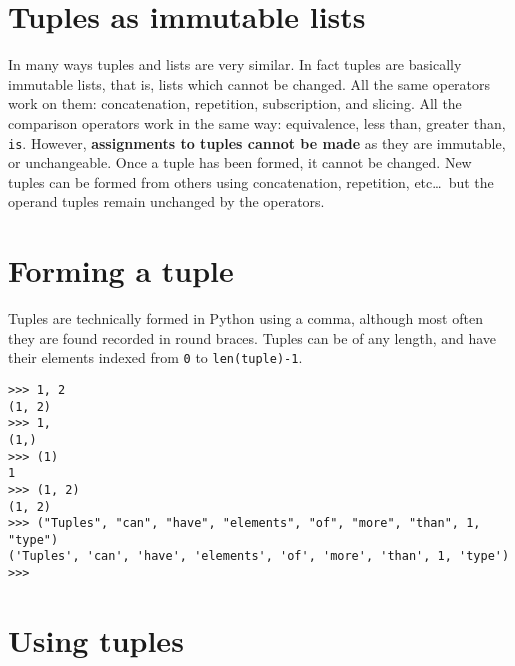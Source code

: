 \section{Tuples as immutable lists}

In many ways tuples and lists are very similar. In fact tuples are   basically immutable lists, that is, lists which cannot be changed. All   the same operators work on them: concatenation, repetition,   subscription, and slicing. All the comparison operators work in the   same way: equivalence, less than, greater than, \texttt{is}. However,   \textbf{assignments to tuples cannot be made} as they are   immutable, or unchangeable.  Once a tuple has been formed, it cannot be   changed. New tuples can be formed from others using concatenation,   repetition, etc\ldots\ but the operand tuples remain unchanged by the   operators.

\section{Forming a tuple}

Tuples are technically formed in Python using a comma, although most   often they are found recorded in round braces. Tuples can be of any   length, and have their elements indexed from \texttt{0} to \texttt{len(tuple)-1}.
\begin{lstlisting}
>>> 1, 2
(1, 2)
>>> 1, 
(1,)
>>> (1)
1
>>> (1, 2)
(1, 2)
>>> ("Tuples", "can", "have", "elements", "of", "more", "than", 1, "type")
('Tuples', 'can', 'have', 'elements', 'of', 'more', 'than', 1, 'type')
>>>
\end{lstlisting}

\section{Using tuples}


